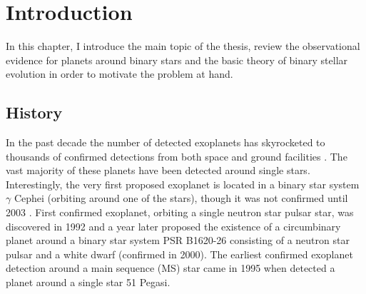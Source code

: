 \documentclass[twoside,openright,titlepage,numbers=noenddot,headinclude,%
                footinclude=true,cleardoublepage=empty,abstractoff, 
                BCOR=5mm,paper=a4,fontsize=11pt,%
                american,%
                ]{scrreprt}%
\begin{document}
\frenchspacing
\raggedbottom
{} %
\pagestyle{plain}
%

%



\pagestyle{scrheadings}

\cleardoublepage
\cleardoublepage{}
\chapter{Introduction}\label{ch:introduction}
In this chapter, I introduce the main topic of the thesis, review the 
observational evidence for planets around binary stars and the 
basic theory of binary stellar evolution in order to motivate the problem
at hand.

\section{History}
\label{sec:History}
In the past decade the number of detected exoplanets has skyrocketed
 to thousands of confirmed detections from both space and ground facilities 
 \citep{fabrycky2015}. The vast majority
 of these planets have been detected around single stars. Interestingly, 
 the very first proposed exoplanet \citep{campbell1988} is located in a 
 binary star system $\gamma$ Cephei (orbiting around one of the stars), 
 though it was not confirmed until 2003 \citep{hatzes2003}. First confirmed 
 exoplanet, orbiting a single neutron star pulsar star, was discovered in 1992 
 \citep{pulsar_planet} and a year later
 \citet{thorsett1993} proposed the existence of a circumbinary planet around
 a binary star system PSR B1620-26 consisting of a neutron star 
 pulsar and a white dwarf (confirmed in 2000). The earliest confirmed 
 exoplanet detection around a main sequence (MS) star
 came in 1995 when \citet{mayor1995} detected a planet around a single star
 51 Pegasi.  
\end{document}

